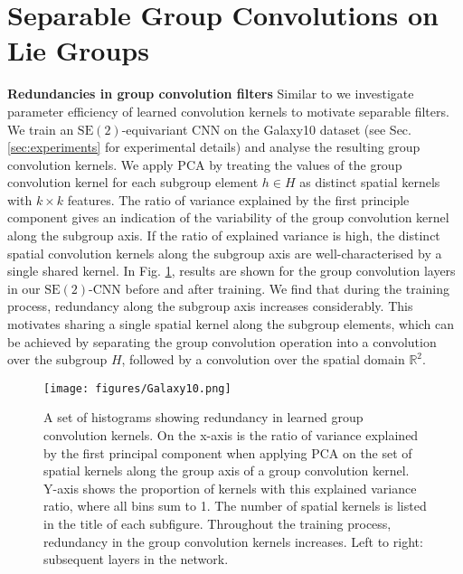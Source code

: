 \documentclass[nohyperref]{article}
\theoremstyle{plain}
\theoremstyle{definition}
\theoremstyle{remark}
\newcommand{\R}{\mathbb{R}}
\begin{document}
\section{Separable Group Convolutions on Lie Groups} \label{sec:sep-ckgconvs}
\textbf{Redundancies in group convolution filters} Similar to \citet{haase2020rethinking,lengyel2021exploiting} we investigate parameter efficiency of learned convolution kernels to motivate separable filters. We train an $\mathrm{SE(2)}$-equivariant CNN on the Galaxy10 dataset (see Sec. \ref{sec:experiments} for experimental details) and analyse the resulting group convolution kernels. We apply PCA by treating the values of the group convolution kernel for each subgroup element $h \in H$ as distinct spatial kernels with $k\times k$ features. The ratio of variance explained by the first principle component gives an indication of the variability of the group convolution kernel along the subgroup axis. If the ratio of explained variance is high, the distinct spatial convolution kernels along the subgroup axis are well-characterised by a single shared kernel. In Fig. \ref{fig:redundancy}, results are shown for the group convolution layers in our $\mathrm{SE(2)}$-CNN before and after training. We find that during the training process, redundancy along the subgroup axis increases considerably. This motivates sharing a single spatial kernel along the subgroup elements, which can be achieved by separating the group convolution operation \break into a convolution over the subgroup $H$, followed by a convolution over the spatial domain $\R^2$.
\begin{figure}
\begin{center}
\texttt{[image: figures/Galaxy10.png]}
\end{center}
\caption{A set of histograms showing redundancy in learned group convolution kernels. On the x-axis is the ratio of variance explained by the first principal component when applying PCA on the set of spatial kernels along the group axis of a group convolution kernel. Y-axis shows the proportion of kernels with this explained variance ratio, where all bins sum to 1. The number of spatial kernels is listed in the title of each subfigure. Throughout the training process, redundancy in the group convolution kernels increases. Left to right: subsequent layers in the network. \vspace{-2mm}}
\label{fig:redundancy}
\end{figure}
\end{document}
